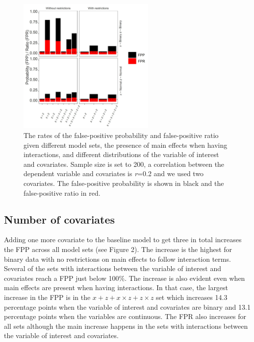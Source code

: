 \begin{figure}[hbt!]
\includegraphics[width=0.6\textwidth]{R/Analysis/Result/Figures/Figure1A.jpeg}
\centering
\caption{The rates of the false-positive probability and false-positive ratio given different model sets, the presence of main effects when having interactions, and different distributions of the variable of interest and covariates. Sample size is set to 200, a correlation between the dependent variable and covariates is \textit{r}=0.2 and we used two covariates. The false-positive probability is shown in black and the false-positive ratio in red.}
\label{fig:mainfigure}
\end{figure}

\subsection{Number of covariates}
Adding one more covariate to the baseline model to get three in total increases the FPP across all model sets (see Figure 2). The increase is the highest for binary data with no restrictions on main effects to follow interaction terms. Several of the sets with interactions between the variable of interest and covariates reach a FPP just below 100\%. The increase is also evident even when main effects are present when having interactions. In that case, the largest increase in the FPP is in the $x + z+ x \times z + z \times z$ set which increases 14.3 percentage points when the variable of interest and covariates are binary and 13.1 percentage points when the variables are continuous. The FPR also increases for all sets although the main increase happens in the sets with interactions between the variable of interest and covariates. 

